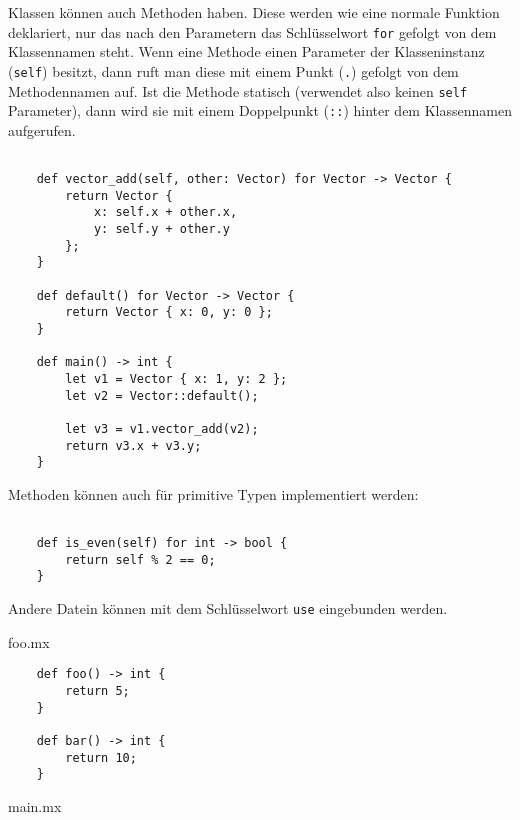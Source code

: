         Klassen können auch Methoden haben. Diese werden wie eine normale Funktion deklariert, nur das 
        nach den Parametern das Schlüsselwort \texttt{for} gefolgt von dem Klassennamen steht.
        Wenn eine Methode einen Parameter der Klasseninstanz (\texttt{self}) besitzt, dann ruft man diese mit einem Punkt (\texttt{.}) gefolgt 
        von dem Methodennamen auf. Ist die Methode statisch (verwendet also keinen \texttt{self} Parameter), dann wird sie mit einem Doppelpunkt (\texttt{::}) hinter dem Klassennamen aufgerufen.


        \begin{lstlisting}

    def vector_add(self, other: Vector) for Vector -> Vector {
        return Vector { 
            x: self.x + other.x, 
            y: self.y + other.y 
        };
    }

    def default() for Vector -> Vector {
        return Vector { x: 0, y: 0 };
    }
        
    def main() -> int {
        let v1 = Vector { x: 1, y: 2 };
        let v2 = Vector::default();

        let v3 = v1.vector_add(v2);
        return v3.x + v3.y;
    }

        \end{lstlisting}
        \newpage
        Methoden können auch für primitive Typen implementiert werden:

        \begin{lstlisting}

    def is_even(self) for int -> bool {
        return self % 2 == 0;
    }
        \end{lstlisting}

        
        Andere Datein können mit dem Schlüsselwort \texttt{use} eingebunden werden.

        \begin{center}
            foo.mx
        \end{center}
        
        \begin{lstlisting}
    def foo() -> int {
        return 5;
    }

    def bar() -> int {
        return 10;
    }
        \end{lstlisting}

        \begin{center}
            main.mx
        \end{center}

